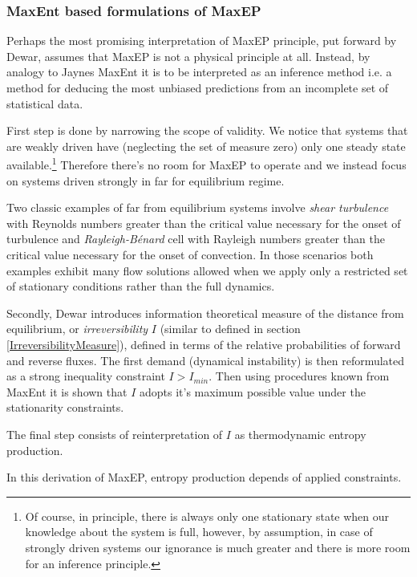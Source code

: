 \documentclass[a4paper,12pt]{article}
\begin{document}
\subsubsection{MaxEnt based formulations of MaxEP}

Perhaps the most promising interpretation of MaxEP principle, put forward by Dewar\cite{Dewar:775452, Dewar:2009fg, Dewar:2005eo}, assumes that MaxEP is not a physical principle at all. Instead, by analogy to Jaynes MaxEnt it is to be interpreted as an inference method i.e. a method for deducing the most unbiased predictions from an incomplete set of statistical data. 

First step is done by narrowing the scope of validity. We notice that systems that are weakly driven have (neglecting the set of measure zero) only one steady state available.\footnote{Of course, in principle, there is always only one stationary state when our knowledge about the system is full, however, by assumption, in case of strongly driven systems our ignorance is much greater and there is more room for an inference principle.} Therefore there's no room for MaxEP to operate and we instead focus on systems driven strongly in far for equilibrium regime.

Two classic examples of far from equilibrium systems involve \textit{shear turbulence} with Reynolds numbers greater than the critical value necessary for the onset of turbulence and \textit{Rayleigh-Bénard} cell with Rayleigh numbers greater than the critical value necessary for the onset of convection.
In those scenarios both examples exhibit many flow solutions allowed when we apply only a restricted set of stationary conditions rather than the full dynamics.

Secondly, Dewar introduces information theoretical measure of the distance from equilibrium, or \textit{irreversibility} $I$ (similar to defined in section \ref{IrreversibilityMeasure}), defined in terms of the relative probabilities of forward and reverse fluxes. 
The first demand (dynamical instability) is then reformulated as a strong inequality constraint $I>I_{min}$. 
Then using procedures known from MaxEnt it is shown that $I$ adopts it's maximum possible value under the stationarity constraints.

The final step consists of reinterpretation of $I$ as thermodynamic entropy production. 

In this derivation of MaxEP, entropy production depends of applied constraints.
\end{document}
